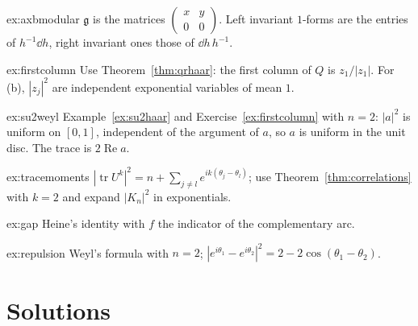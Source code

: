 \begin{hint}{ex:axbmodular}
$\mathfrak g$ is the matrices $\begin{pmatrix}x&y\\0&0\end{pmatrix}$. Left invariant $1$-forms are the entries of $h^{-1}\dd h$, right invariant ones those of $\dd h\,h^{-1}$.
\end{hint}

\begin{hint}{ex:firstcolumn}
Use Theorem~\ref{thm:qrhaar}: the first column of $Q$ is $z_1/|z_1|$. For (b), $|z_j|^2$ are independent exponential variables of mean $1$.
\end{hint}

\begin{hint}{ex:su2weyl}
Example~\ref{ex:su2haar} and Exercise~\ref{ex:firstcolumn} with $n=2$: $|a|^2$ is uniform on $[0,1]$, independent of the argument of $a$, so $a$ is uniform in the unit disc. The trace is $2\operatorname{Re}a$.
\end{hint}

\begin{hint}{ex:tracemoments}
$|\operatorname{tr}U^k|^2=n+\sum_{j\neq l}e^{ik(\theta_j-\theta_l)}$; use Theorem~\ref{thm:correlations} with $k=2$ and expand $|K_n|^2$ in exponentials.
\end{hint}

\begin{hint}{ex:gap}
Heine's identity with $f$ the indicator of the complementary arc.
\end{hint}

\begin{hint}{ex:repulsion}
Weyl's formula with $n=2$; $|e^{i\theta_1}-e^{i\theta_2}|^2=2-2\cos(\theta_1-\theta_2)$.
\end{hint}

\section{Solutions}

